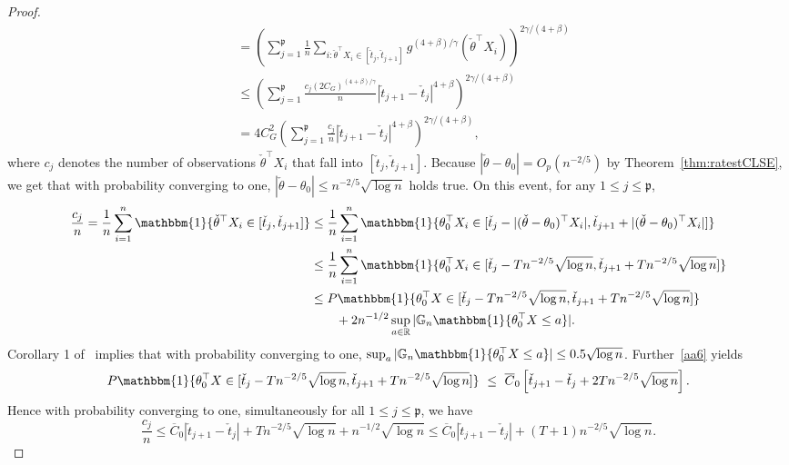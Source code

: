 {\begin{proof}
{\begin{align}
&= \left(\sum_{j=1}^{\mathfrak{p}}\frac{1}{n}\sum_{i:\check{\theta}^{\top}X_i\in[\check{t}_j, \check{t}_{j+1}]} g^{(4+\beta)/\gamma}(\check{\theta}^{\top}X_i)\right)^{2\gamma/(4 + \beta)}\label{eq:FirstBound_f_and_fbar}\\ 
&\le \left(\sum_{j=1}^\mathfrak{p} \frac{c_j(2C_G)^{(4+\beta)/\gamma}}{n}|\check{t}_{j+1} - \check{t}_j|^{4 + \beta}\right)^{2\gamma/(4 + \beta)}\\ &= 4C_G^2\left(\sum_{j=1}^\mathfrak{p} \frac{c_j}{n}|\check{t}_{j+1} - \check{t}_j|^{4 + \beta}\right)^{2\gamma/(4 + \beta)},\nonumber
\end{align}
}
where $c_j$ denotes the number of observations $\check{\theta}^{\top}X_i$ that fall into $[\check{t}_j, \check{t}_{j+1}]$. Because $|\check{\theta} - \theta_0| = O_p(n^{-2/5})$ by Theorem~\ref{thm:ratestCLSE}, we get that with probability converging to one, $|\check{\theta} - \theta_0| \le n^{-2/5}\sqrt{\log n}$ holds true. On this event, for any $1\le j\le \mathfrak{p}$,
\begin{align*}
\frac{c_j}{n} = \frac{1}{n}\sum_{i=1}^n \mathbbm{1}\{\check{\theta}^{\top}X_i\in[\check{t}_j, \check{t}_{j+1}]\} &\le \frac{1}{n}\sum_{i=1}^n \mathbbm{1}\{\theta_0^{\top}X_i\in[\check{t}_{j} - |(\check{\theta} - \theta_0)^{\top}X_i|, \check{t}_{j+1} + |(\check{\theta} - \theta_0)^{\top}X_i|]\}\\
&\le \frac{1}{n}\sum_{i=1}^n \mathbbm{1}\{\theta_0^{\top}X_i\in[\check{t}_j - Tn^{-2/5}\sqrt{\log n}, \check{t}_{j+1} + Tn^{-2/5}\sqrt{\log n}]\}\\
&\le P\mathbbm{1}\{\theta_0^{\top}X\in [\check{t}_j - Tn^{-2/5}\sqrt{\log n}, \check{t}_{j+1} + Tn^{-2/5}\sqrt{\log n}]\}\\ &\qquad+ 2n^{-1/2}\sup_{a\in\mathbb{R}}{|\mathbb{G}_n\mathbbm{1}\{\theta_0^{\top}X \le a\}|
}.%
\end{align*}
Corollary 1 of~\cite{massart1990tight} implies that with probability converging to one, $\sup_{a}|\mathbb{G}_n\mathbbm{1}\{\theta_0^{\top}X \le a\}| \le 0.5\sqrt{\log n}$. Further~\ref{aa6} yields
\[
P\mathbbm{1}\{\theta_0^{\top}X\in [\check{t}_j - Tn^{-2/5}\sqrt{\log n}, \check{t}_{j+1} + Tn^{-2/5}\sqrt{\log n}]\} ~\le~ { \overline{C}_0}\left[\check{t}_{j+1} - \check{t}_j + 2Tn^{-2/5}\sqrt{\log n}\right].
\]
Hence with probability converging to one, simultaneously for all $1\le j\le \mathfrak{p}$, we have
\[
\frac{c_j}{n} \le \overline{C}_0|\check{t}_{j+1} - \check{t}_j| + Tn^{-2/5}\sqrt{\log n} + n^{-1/2}\sqrt{\log n} \le { \overline{C}_0}|\check{t}_{j+1} - \check{t}_j| + (T + 1)n^{-2/5}\sqrt{\log n}.
\]
\end{proof}}

